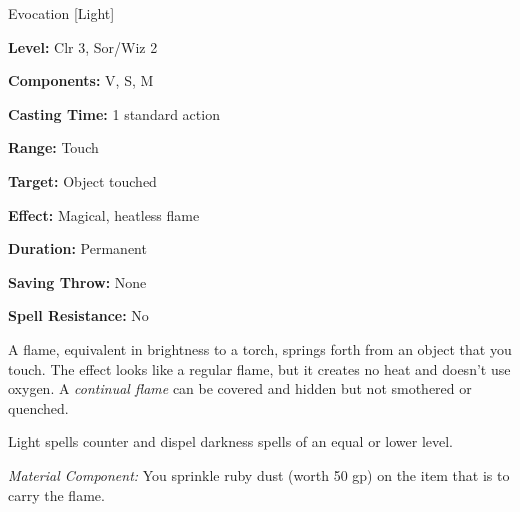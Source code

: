 
Evocation [Light]

\textbf{Level:} Clr 3, Sor/Wiz 2

\textbf{Components:} V, S, M

\textbf{Casting Time:} 1 standard action

\textbf{Range:} Touch

\textbf{Target:} Object touched

\textbf{Effect:} Magical, heatless flame

\textbf{Duration:} Permanent

\textbf{Saving Throw:} None

\textbf{Spell Resistance:} No

A flame, equivalent in brightness to a torch, springs forth from an object that 
you touch. The effect looks like a regular flame, but it creates no heat and doesn't 
use oxygen. A \textit{continual flame} can be covered and hidden but not smothered 
or quenched.

Light spells counter and dispel darkness spells of an equal or lower level.

\textit{Material Component:} You sprinkle ruby dust (worth 50 gp) on the item that 
is to carry the flame.

